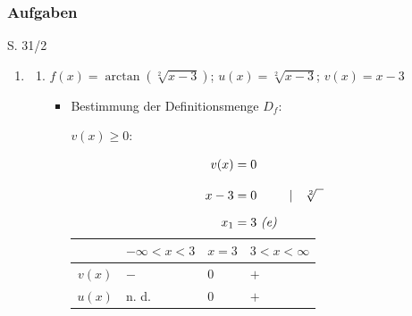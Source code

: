 
\subsubsection{Aufgaben}

\begin{Exercise}{S. 31/2}{}
    \begin{enumerate}
        \item [2.]\begin{enumerate}[label=\alph*)]
            \item[a)] {
                $f(x) = \arctan\left(\sqrt[2]{x-3}\right)$; \qquad $u(x) = \sqrt[2]{x-3}$; \qquad $v(x) = x-3$ \\[-2.0ex]
                \begin{itemize}[leftmargin=*]
                    \item Bestimmung der Definitionsmenge $D_{f}$: \\[1.0ex]{
                        $v(x) \geq 0:$\\[-2.0ex]
                        \begin{minipage}[t]{0.4\linewidth}
                            \vspace{-6.0ex}
                            \begin{align*}
                                v(x) &= 0 &&\\[2.0ex]
                                x - 3 &= 0 &&| \quad \sqrt[2]{\phantom{x}}\\[1.5ex]
                                x_{1} &= 3 \ \text{\textit{(e)}} && \\[-1.0ex]
                            \end{align*}
                        \end{minipage}
                        \hfill
                        \begin{minipage}[t]{0.5\linewidth}
                            \begin{tabularx}{0.95\linewidth}{c|X|X|X}
                                & $-\infty < x < 3$ & $x = 3$ & $3 < x < \infty$ \\ \hline
                                $v(x)$ & $-$ & $0$ & $+$ \\ \hline
                                $u(x)$ & n. d. & $0$ & $+$ \\              
                            \end{tabularx}  
                        \end{minipage}
}
\end{itemize}}
\end{enumerate}
\end{enumerate}
\end{Exercise}
